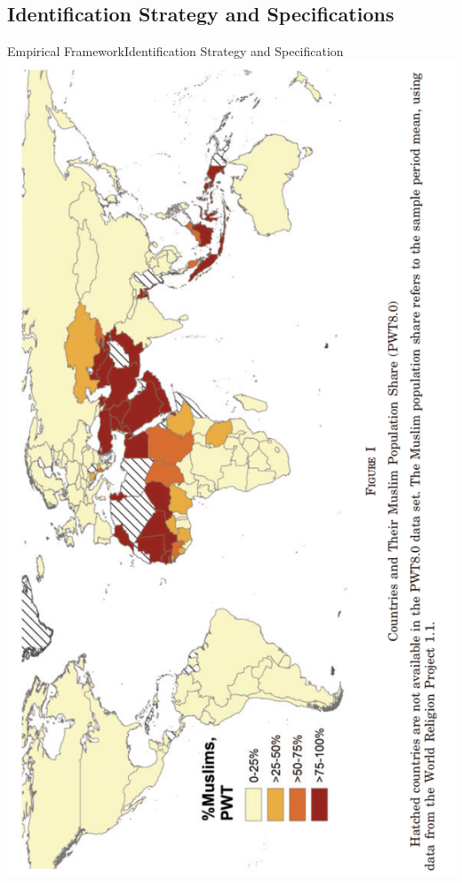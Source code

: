 \documentclass[pdftex,12pt,xcolor=pdftex,table]{beamer}
\begin{document}
\subsection{Identification Strategy and Specifications}
    \begin{frame}{Empirical Framework}{Identification Strategy and Specification}
    \centering
    \includegraphics[scale=0.55, angle =270 ]{Map.png}
    \end{frame}
    
\end{document}
